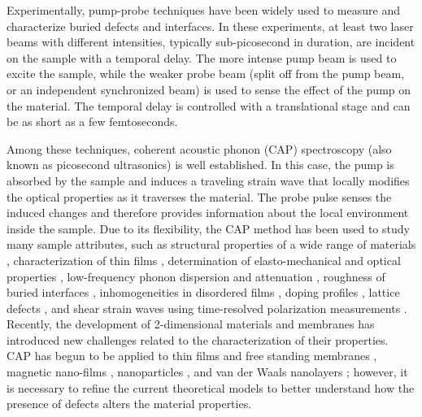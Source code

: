 \documentclass[aps,prb,10pt,showkeys,letterpaper,notitlepage,twocolumn]{revtex4-1}
\begin{document}
Experimentally, pump-probe techniques \cite{thomsenPRL84, thomsenPRB86,
grahnJQE89, linJAP91, pfeiferPRL92} have been widely used to measure and
characterize buried defects and interfaces. In these experiments, at least two
laser beams with different intensities, typically sub-picosecond in duration,
are incident on the sample with a temporal delay. The more intense pump beam is
used to excite the sample, while the weaker probe beam (split off from the pump
beam, or an independent synchronized beam) is used to sense the effect of the
pump on the material. The temporal delay is controlled with a translational
stage and can be as short as a few femtoseconds.

Among these techniques, coherent acoustic phonon (CAP) spectroscopy (also known
as picosecond ultrasonics) is well established. In this case, the pump is
absorbed by the sample and induces a traveling strain wave that locally modifies
the optical properties as it traverses the material. The probe pulse senses the
induced changes and therefore provides information about the local environment
inside the sample. Due to its flexibility, the CAP method has been used to study
many sample attributes, such as structural properties of a wide range of
materials \cite{limAPL03, bozovicPRB04, matsudaPRL04, rossignolPRL05, parkPRB05,
wuAPL06, millerPRB06, wenAPL07, xuPSSC08, hudertJAP08, ruelloPRB09,
babilottePRB10, ruelloAPL12, chenAPL12}, characterization of thin films
\cite{gusevJAP11, matsudaJOSAB02}, determination of elasto-mechanical and
optical properties \cite{grahnAPL88a, grahnAPL88b, rossignolPRL05, millerPRB06,
xuPSSC08, taneiPRL08, qiPRB10}, low-frequency phonon dispersion and attenuation
\cite{zhuPRB91, dalyPRB09}, roughness of buried interfaces \cite{tasAPL98},
inhomogeneities in disordered films \cite{gusevJAP11}, doping profiles
\cite{hudertJAP08}, lattice defects \cite{steigerwaldJAP12, steigerwaldAPL09,
gregoryAPL12, baydinAPLP16}, and shear strain waves using time-resolved
polarization measurements \cite{mounierEPJST08, mounierOE10}. Recently, the
development of 2-dimensional materials and membranes has introduced new
challenges related to the characterization of their properties. CAP has begun to
be applied to thin films and free standing membranes \cite{linJPD16, hePRB17},
magnetic nano-films \cite{linnikPS17}, nanoparticles \cite{baldiniNL18}, and van
der Waals nanolayers \cite{greenerPRB18}; however, it is necessary to refine the
current theoretical models to better understand how the presence of defects
alters the material properties.
 
\end{document}
